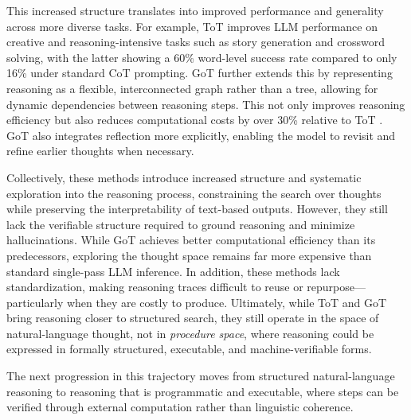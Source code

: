 \documentclass[project]{bsu-cs}  %
\begin{document}
This increased structure translates into improved performance and generality across more diverse tasks. For example, ToT improves LLM performance on creative and reasoning-intensive tasks such as story generation and crossword solving, with the latter showing a 60\% word-level success rate compared to only 16\% under standard CoT prompting. GoT further extends this by representing reasoning as a flexible, interconnected graph rather than a tree, allowing for dynamic dependencies between reasoning steps. This not only improves reasoning efficiency but also reduces computational costs by over 30\% relative to ToT \citep{Besta_2024}. GoT also integrates reflection more explicitly, enabling the model to revisit and refine earlier thoughts when necessary.

Collectively, these methods introduce increased structure and systematic exploration into the reasoning process, constraining the search over thoughts while preserving the interpretability of text-based outputs. However, they still lack the verifiable structure required to ground reasoning and minimize hallucinations. While GoT achieves better computational efficiency than its predecessors, exploring the thought space remains far more expensive than standard single-pass LLM inference. In addition, these methods lack standardization, making reasoning traces difficult to reuse or repurpose—particularly when they are costly to produce. Ultimately, while ToT and GoT bring reasoning closer to structured search, they still operate in the space of natural-language thought, not in \textit{procedure space}, where reasoning could be expressed in formally structured, executable, and machine-verifiable forms.

The next progression in this trajectory moves from structured natural-language reasoning to reasoning that is programmatic and executable, where steps can be verified through external computation rather than linguistic coherence.
\end{document}
